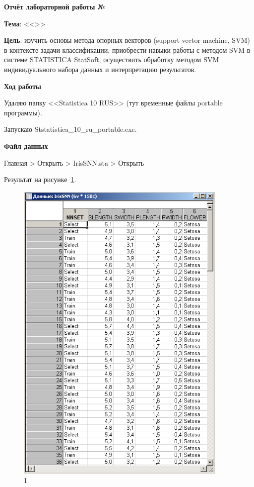 \begin{center}
  \textbf{Отчёт лабораторной работы №\envReportLabNumber}
\end{center}

\textbf{Тема}:
<<\envReportTitle>>

\textbf{Цель}:
изучить основы метода опорных векторов (support vector machine, SVM) в
контексте задачи классификации, приобрести навыки работы с методом SVM в
системе STATISTICA StatSoft, осуществить обработку методом SVM
индивидуального набора данных и интерпретацию результатов.

\begin{center}
  \textbf{Ход работы}
\end{center}

Удаляю папку <<Statistica 10 RUS>> (тут временные файлы portable программы).

Запускаю Ststatistica\_10\_ru\_portable.exe.

\begin{center}
  \textbf{Файл данных}
\end{center}

Главная > Открыть > IrisSNN.sta > Открыть

Результат на рисунке~\ref{fig:1}.

\begin{figure}[!h]
  \centering

  \includegraphics[height=15cm]
  {inc/ex_1.PNG}

  \caption{1}

  \label{fig:1}
\end{figure}

